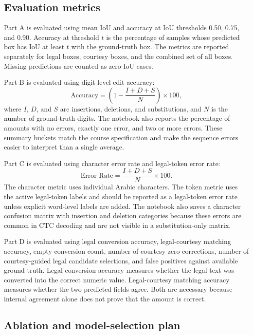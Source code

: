 \documentclass{article}
\begin{document}
\subsection{Evaluation metrics}

Part A is evaluated using mean IoU and accuracy at IoU thresholds 0.50, 0.75, and 0.90. Accuracy at threshold \(t\) is the percentage of samples whose predicted box has IoU at least \(t\) with the ground-truth box. The metrics are reported separately for legal boxes, courtesy boxes, and the combined set of all boxes. Missing predictions are counted as zero-IoU cases.

Part B is evaluated using digit-level edit accuracy:
\[
  \text{Accuracy} =
  \left(1 - \frac{I + D + S}{N}\right) \times 100,
\]
where \(I\), \(D\), and \(S\) are insertions, deletions, and substitutions, and \(N\) is the number of ground-truth digits. The notebook also reports the percentage of amounts with no errors, exactly one error, and two or more errors. These summary buckets match the course specification and make the sequence errors easier to interpret than a single average.

Part C is evaluated using character error rate and legal-token error rate:
\[
  \text{Error Rate} =
  \frac{I + D + S}{N} \times 100.
\]
The character metric uses individual Arabic characters. The token metric uses the active legal-token labels and should be reported as a legal-token error rate unless explicit word-level labels are added. The notebook also saves a character confusion matrix with insertion and deletion categories because these errors are common in CTC decoding and are not visible in a substitution-only matrix.

Part D is evaluated using legal conversion accuracy, legal-courtesy matching accuracy, empty-conversion count, number of courtesy zero corrections, number of courtesy-guided legal candidate selections, and false positives against available ground truth. Legal conversion accuracy measures whether the legal text was converted into the correct numeric value. Legal-courtesy matching accuracy measures whether the two predicted fields agree. Both are necessary because internal agreement alone does not prove that the amount is correct.

\subsection{Ablation and model-selection plan}
\end{document}
